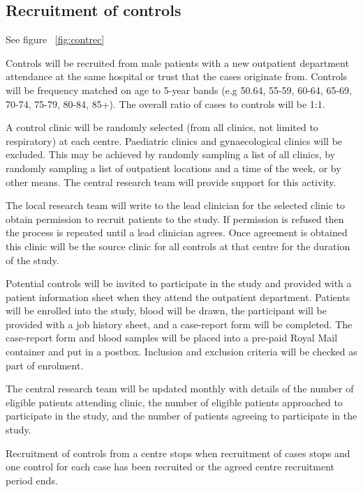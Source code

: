 \documentclass[a4paper,10pt]{article}
\begin{document}
\subsection{Recruitment of controls}

See figure ~\ref{fig:contrec}

 Controls will be recruited from male patients with a new outpatient department attendance at the same hospital or trust that the cases originate from. Controls will be frequency matched on age to 5-year bands (e.g 50.64, 55-59, 60-64, 65-69, 70-74, 75-79, 80-84, 85+). The overall ratio of cases to controls will be 1:1.  

A control clinic will be randomly selected (from all clinics, not limited to respiratory) at each centre. Paediatric clinics and gynaecological clinics will be excluded. This may be achieved by randomly sampling a list of all clinics, by randomly sampling a list of outpatient locations and a time of the week, or by other means. The central research team will provide support for this activity. 

The local research team will write to the lead clinician for the selected clinic to obtain permission to recruit patients to the study. If permission is refused then the process is repeated until a lead clinician agrees. Once agreement is obtained this clinic will be the source clinic for all controls at that centre for the duration of the study.
 
Potential controls will be invited to participate in the study and provided with a patient information sheet when they attend the outpatient department. Patients will be enrolled into the study, blood will be drawn, the participant will be provided with a job history sheet, and a case-report form will be completed. The case-report form and blood samples will be placed into a pre-paid Royal Mail container and put in a postbox. Inclusion and exclusion criteria will be checked as part of enrolment.

The central research team will be updated monthly with details of the number of eligible patients attending clinic, the number of eligible patients approached to participate in the study, and the number of patients agreeing to participate in the study.

Recruitment of controls from a centre stops when recruitment of cases stops and one control for each case has been recruited or the agreed centre recruitment period ends.
\end{document}
